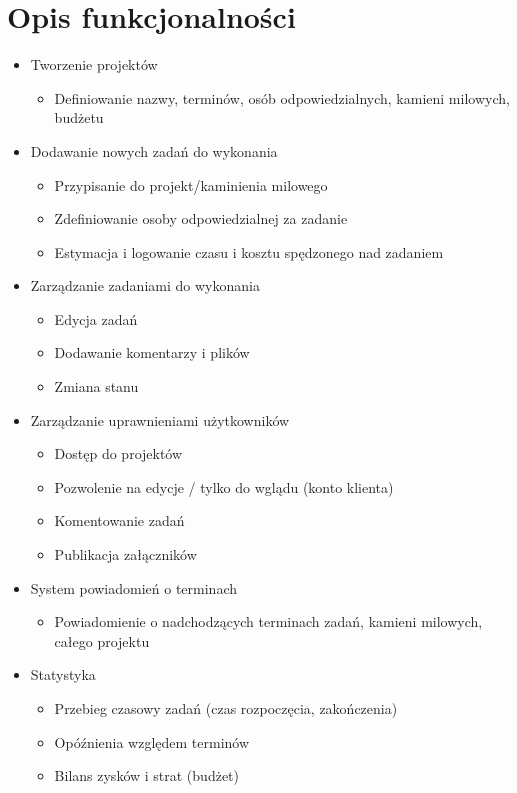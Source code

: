 \documentclass[wide,a4paper,titlepage,12pt] {article}
\begin{document}
  \section{Opis funkcjonalności}
  \begin{itemize}
    \item Tworzenie projektów
      \begin{itemize}
        \item Definiowanie nazwy, terminów, osób odpowiedzialnych, kamieni milowych, budżetu
      \end{itemize}

    \item Dodawanie nowych zadań do wykonania
      \begin{itemize}
        \item Przypisanie do projekt/kaminienia milowego
        \item Zdefiniowanie osoby odpowiedzialnej za zadanie
        \item Estymacja i logowanie czasu i kosztu spędzonego nad zadaniem
      \end{itemize}

   \item Zarządzanie zadaniami do wykonania
     \begin{itemize}
       \item Edycja zadań
       \item Dodawanie komentarzy i plików
       \item Zmiana stanu 
     \end{itemize}
     
    \item Zarządzanie uprawnieniami użytkowników
      \begin{itemize}
        \item Dostęp do projektów
        \item Pozwolenie na edycje / tylko do wglądu (konto klienta)
        \item Komentowanie zadań
        \item Publikacja załączników
      \end{itemize}

    \item System powiadomień o terminach
      \begin{itemize}
        \item Powiadomienie o nadchodzących terminach zadań, kamieni milowych, całego projektu
      \end{itemize}

    \item Statystyka
      \begin{itemize}
        \item Przebieg czasowy zadań (czas rozpoczęcia, zakończenia)
        \item Opóźnienia względem terminów
        \item Bilans zysków i strat (budżet)
      \end{itemize}

  \end{itemize}
\end{document}
